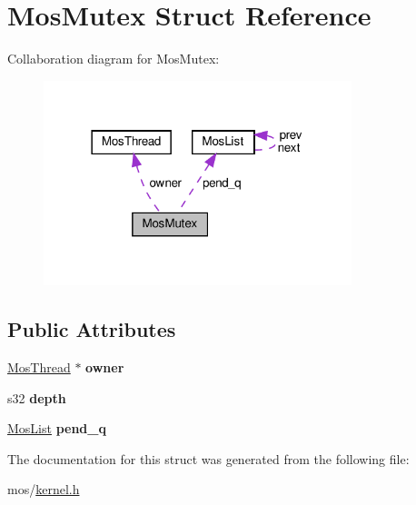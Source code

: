 \hypertarget{structMosMutex}{}\section{Mos\+Mutex Struct Reference}
\label{structMosMutex}


Collaboration diagram for Mos\+Mutex\+:\nopagebreak
\begin{figure}[H]
\begin{center}
\leavevmode
\includegraphics[width=254pt]{structMosMutex__coll__graph}
\end{center}
\end{figure}
\subsection*{Public Attributes}
\begin{DoxyCompactItemize}
\item 
\mbox{\label{structMosMutex_a8eb138a40b29ebc00ddbf52701111403}} 
\hyperlink{structMosThread}{Mos\+Thread} $\ast$ {\bfseries owner}
\item 
\mbox{\label{structMosMutex_ab0d64dea3a92b1035f39ecfd3f91c505}} 
s32 {\bfseries depth}
\item 
\mbox{\label{structMosMutex_abbd3035b55fb5212b2db25f8634870d1}} 
\hyperlink{structMosList}{Mos\+List} {\bfseries pend\+\_\+q}
\end{DoxyCompactItemize}


The documentation for this struct was generated from the following file\+:\begin{DoxyCompactItemize}
\item 
mos/\hyperlink{kernel_8h}{kernel.\+h}\end{DoxyCompactItemize}
